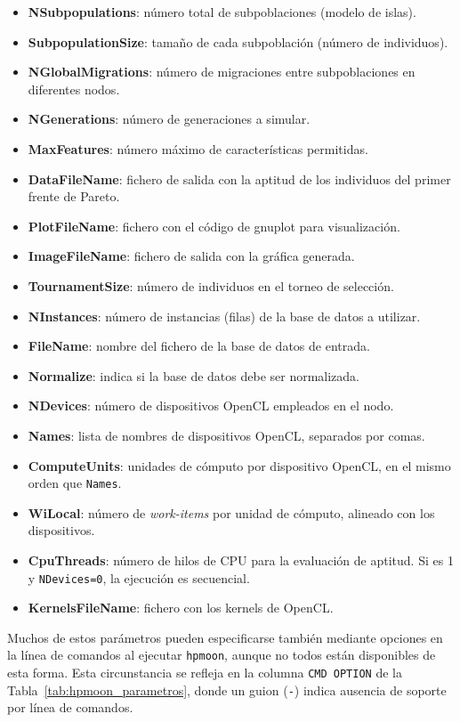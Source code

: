 \begin{itemize}
    \item \textbf{NSubpopulations}: número total de subpoblaciones (modelo de islas).
    \item \textbf{SubpopulationSize}: tamaño de cada subpoblación (número de individuos).
    \item \textbf{NGlobalMigrations}: número de migraciones entre subpoblaciones en diferentes nodos.
    \item \textbf{NGenerations}: número de generaciones a simular.
    \item \textbf{MaxFeatures}: número máximo de características permitidas.
    \item \textbf{DataFileName}: fichero de salida con la aptitud de los individuos del primer frente de Pareto.
    \item \textbf{PlotFileName}: fichero con el código de gnuplot para visualización.
    \item \textbf{ImageFileName}: fichero de salida con la gráfica generada.
    \item \textbf{TournamentSize}: número de individuos en el torneo de selección.
    \item \textbf{NInstances}: número de instancias (filas) de la base de datos a utilizar.
    \item \textbf{FileName}: nombre del fichero de la base de datos de entrada.
    \item \textbf{Normalize}: indica si la base de datos debe ser normalizada.
    \item \textbf{NDevices}: número de dispositivos OpenCL empleados en el nodo.
    \item \textbf{Names}: lista de nombres de dispositivos OpenCL, separados por comas.
    \item \textbf{ComputeUnits}: unidades de cómputo por dispositivo OpenCL, en el mismo orden que \texttt{Names}.
    \item \textbf{WiLocal}: número de \textit{work-items} por unidad de cómputo, alineado con los dispositivos.
    \item \textbf{CpuThreads}: número de hilos de CPU para la evaluación de aptitud. Si es 1 y \texttt{NDevices=0}, la ejecución es secuencial.
    \item \textbf{KernelsFileName}: fichero con los kernels de OpenCL.
\end{itemize}

Muchos de estos parámetros pueden especificarse también mediante opciones en la línea de comandos al ejecutar \texttt{hpmoon}, aunque no todos están disponibles de esta forma. Esta circunstancia se refleja en la columna \texttt{CMD OPTION} de la Tabla~\ref{tab:hpmoon_parametros}, donde un guion (\texttt{-}) indica ausencia de soporte por línea de comandos.

